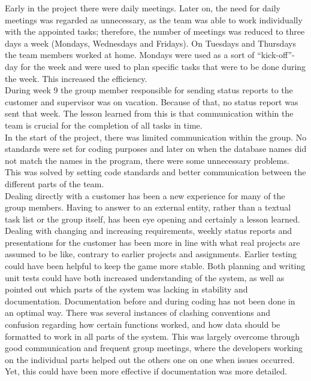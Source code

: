 Early in the project there were daily meetings. Later on, the need for daily meetings was regarded as unnecessary, as the team was able to work individually with the appointed tasks; therefore, the number of meetings was reduced to three days a week (Mondays, Wednesdays and Fridays). On Tuesdays and Thursdays the team members worked at home. Mondays were used as a sort of “kick-off”-day for the week and were used to plan specific tasks that were to be done during the week. This increased the efficiency.\\
\newline
During week 9 the group member responsible for sending status reports to the customer and supervisor was on vacation. Because of that, no status report was sent that week. The lesson learned from this is that communication within the team is crucial for the completion of all tasks in time.\\
\newline
In the start of the project, there was limited communication within the group. No standards were set
for coding purposes and later on when the database names did not match the names in the program, there were some unnecessary problems. This was solved by setting code standards and better communication between the different parts of the team. \\
\newline
Dealing directly with a customer has been a new experience for many of the group members. Having to answer to an external entity, rather than a textual task list or the group itself, has been eye opening and certainly a lesson learned. Dealing with changing and increasing requirements, weekly status reports and presentations for the customer has been more in line with what real projects are assumed to be like, contrary to earlier projects and assignments.
\newline
Earlier testing could have been helpful to keep the game more stable. Both planning and writing unit tests could have both increased understanding of the system, as well as pointed out which parts of the system was lacking in stability and documentation. 
\newline
Documentation before and during coding has not been done in an optimal way. There was several instances of clashing conventions and confusion regarding how certain functions worked, and how data should be formatted to work in all parts of the system. This was largely overcome through good communication and frequent group meetings, where the developers working on the individual parts helped out the others one on one when issues occurred. Yet, this could have been more effective if documentation was more detailed.





